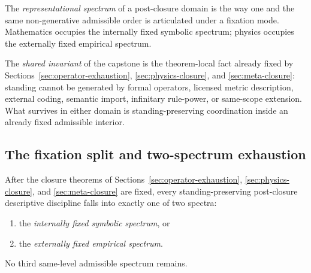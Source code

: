 \begin{definition}
The \emph{representational spectrum} of a post-closure domain is the way one and the same non-generative admissible order is articulated under a fixation mode. Mathematics occupies the internally fixed symbolic spectrum; physics occupies the externally fixed empirical spectrum.
\end{definition}

\begin{definition}
The \emph{shared invariant} of the capstone is the theorem-local fact already fixed by Sections~\ref{sec:operator-exhaustion}, \ref{sec:physics-closure}, and \ref{sec:meta-closure}: standing cannot be generated by formal operators, licensed metric description, external coding, semantic import, infinitary rule-power, or same-scope extension. What survives in either domain is standing-preserving coordination inside an already fixed admissible interior.
\end{definition}

\subsection{The fixation split and two-spectrum exhaustion}

\begin{theorem}
\label{thm:fixation-dichotomy}
After the closure theorems of Sections~\ref{sec:operator-exhaustion}, \ref{sec:physics-closure}, and \ref{sec:meta-closure} are fixed, every standing-preserving post-closure descriptive discipline falls into exactly one of two spectra:
\begin{enumerate}
  \item the \emph{internally fixed symbolic spectrum}, or
  \item the \emph{externally fixed empirical spectrum}.
\end{enumerate}
No third same-level admissible spectrum remains.
\end{theorem}

